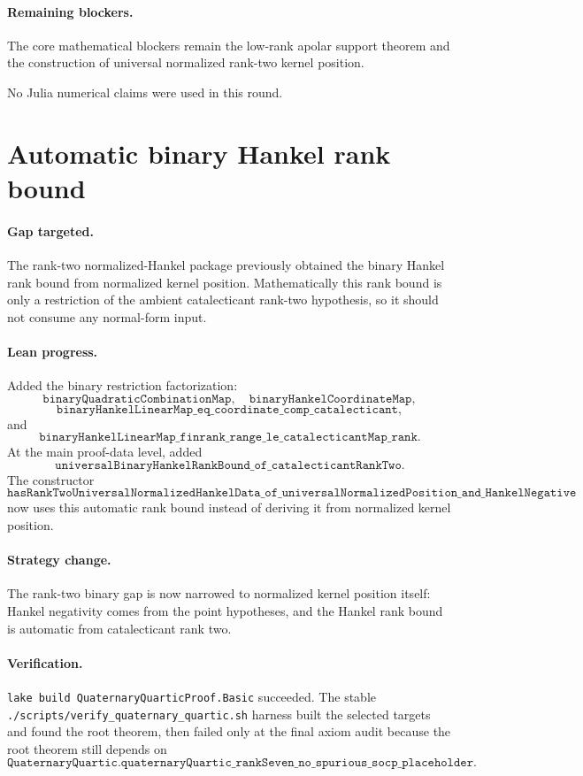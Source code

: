 \documentclass[11pt]{article}
\begin{document}
\paragraph{Remaining blockers.}
The core mathematical blockers remain the low-rank apolar support theorem and
the construction of universal normalized rank-two kernel position.

No Julia numerical claims were used in this round.

\section*{Automatic binary Hankel rank bound}

\paragraph{Gap targeted.}
The rank-two normalized-Hankel package previously obtained the binary Hankel
rank bound from normalized kernel position.  Mathematically this rank bound is
only a restriction of the ambient catalecticant rank-two hypothesis, so it
should not consume any normal-form input.

\paragraph{Lean progress.}
Added the binary restriction factorization:
\[
\texttt{binaryQuadraticCombinationMap},\quad
\texttt{binaryHankelCoordinateMap},
\]
\[
\texttt{binaryHankelLinearMap\_eq\_coordinate\_comp\_catalecticant},
\]
and
\[
\texttt{binaryHankelLinearMap\_finrank\_range\_le\_catalecticantMap\_rank}.
\]
At the main proof-data level, added
\[
\texttt{universalBinaryHankelRankBound\_of\_catalecticantRankTwo}.
\]
The constructor
\[
\texttt{hasRankTwoUniversalNormalizedHankelData\_of\_universalNormalizedPosition\_and\_HankelNegative}
\]
now uses this automatic rank bound instead of deriving it from normalized
kernel position.

\paragraph{Strategy change.}
The rank-two binary gap is now narrowed to normalized kernel position itself:
Hankel negativity comes from the point hypotheses, and the Hankel rank bound is
automatic from catalecticant rank two.

\paragraph{Verification.}
\texttt{lake build QuaternaryQuarticProof.Basic} succeeded.  The stable
\texttt{./scripts/verify\_quaternary\_quartic.sh} harness built the selected
targets and found the root theorem, then failed only at the final axiom audit
because the root theorem still depends on
\[
\texttt{QuaternaryQuartic.quaternaryQuartic\_rankSeven\_no\_spurious\_socp\_placeholder}.
\]
\end{document}

